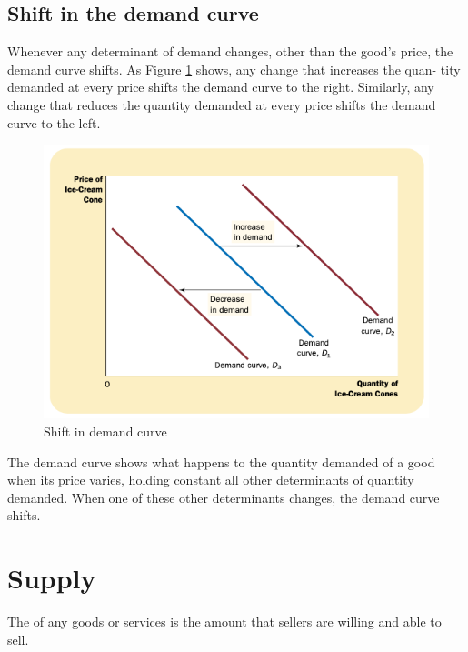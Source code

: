 \subsection{Shift in the demand curve}



Whenever any determinant of demand changes, other than the good's price, the demand curve shifts.
As Figure \ref{fig:shift-in-demand-curve} shows, any change that increases the quan- tity demanded at every price shifts the demand curve to the right.
Similarly, any change that reduces the quantity demanded at every price shifts the demand curve to the left.

\begin{figure}[!ht]
  \centering
  \includegraphics[width=\textwidth]{pics/shift-in-demand-curve}
  \caption{Shift in demand curve}
  \label{fig:shift-in-demand-curve}
\end{figure}

\begin{tcolorbox}
  The demand curve shows what happens to the quantity demanded of a good when its price varies, holding constant all other determinants of quantity demanded.
  When one of these other determinants changes, the demand curve shifts.
\end{tcolorbox}

\section{Supply}

The  of any goods or services is the amount that sellers are willing and able to sell.


